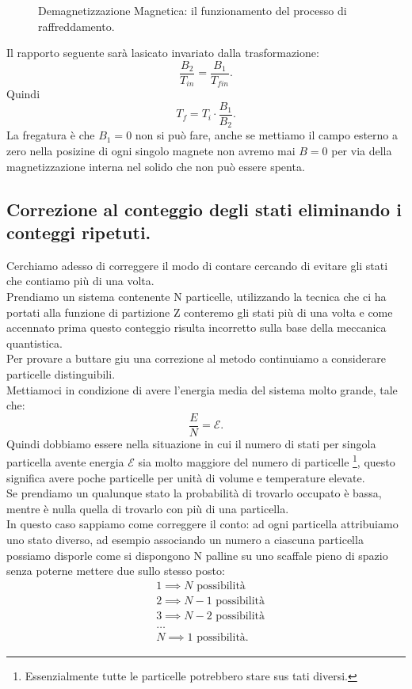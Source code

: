 \begin{figure}[H]
    \centering
    \caption{Demagnetizzazione Magnetica: il funzionamento del processo di raffreddamento.}
    \label{fig:demagnetizzazione-adiabatica-1}
\end{figure}
\noindent
Il rapporto seguente sarà lasicato invariato dalla trasformazione:
\[
	\frac{B_2}{T_{in}} = \frac{B_1}{T_{fin}}
.\] 
Quindi 
\[
	T_{f} = T_{i}\cdot \frac{B_1}{B_2}
.\] 
La fregatura è che $B_1=0$ non si può fare, anche se mettiamo il campo esterno a zero nella posizine di ogni singolo magnete non avremo mai $B = 0$ per via della magnetizzazione interna nel solido che non può essere spenta.\\
\subsection{Correzione al conteggio degli stati eliminando i conteggi ripetuti.}%
Cerchiamo adesso di correggere il modo di contare cercando di evitare gli stati che contiamo più di una volta.\\
Prendiamo un sistema contenente N particelle, utilizzando la tecnica che ci ha portati alla funzione di partizione Z conteremo gli stati più di una volta e come accennato prima questo conteggio risulta incorretto sulla base della meccanica quantistica.\\
Per provare a buttare giu una correzione al metodo continuiamo a considerare particelle distinguibili.\\
Mettiamoci in condizione di avere l'energia media del sistema molto grande, tale che:
\[
	\frac{E}{N} = \mathcal{E} 
.\] 
Quindi dobbiamo essere nella situazione in cui il numero di stati per singola particella avente energia $\mathcal{E}$ sia molto maggiore del numero di particelle \footnote{Essenzialmente tutte le particelle potrebbero stare sus tati diversi.}, questo significa avere poche particelle per unità di volume e temperature elevate.\\
Se prendiamo un qualunque stato la probabilità di trovarlo occupato è bassa, mentre è nulla quella di trovarlo con più di una particella.\\
In questo caso sappiamo come correggere il conto: ad ogni particella attribuiamo uno stato diverso, ad esempio associando un numero a ciascuna particella possiamo disporle come si dispongono N palline su uno scaffale pieno di spazio senza poterne mettere due sullo stesso posto:
\begin{align}
	&1 \implies N \text{ possibilità}\\
	&2 \implies N-1 \text{ possibilità}\\
	&3 \implies N-2 \text{ possibilità}\\
	&\ldots\\
	&N \implies 1 \text{ possibilità}
.\end{align}
